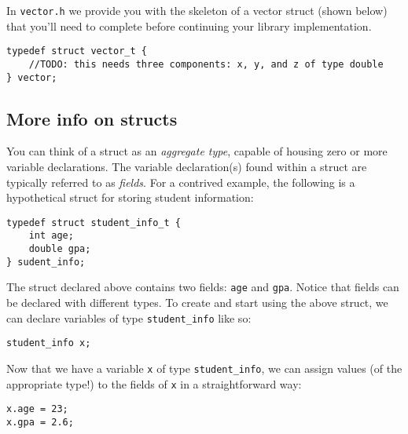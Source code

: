 \documentclass[12pt]{article}
\begin{document}
In \texttt{vector.h} we provide you with the skeleton of a vector struct (shown below) that you'll need to complete before continuing your library implementation.

\begin{mdframed}[backgroundcolor=light-gray, innerleftmargin=10, innertopmargin=1,innerbottommargin=1,linecolor=light-gray]
\begin{lstlisting}
typedef struct vector_t {
    //TODO: this needs three components: x, y, and z of type double
} vector;
\end{lstlisting}
\end{mdframed}

\subsection{More info on structs}

You can think of a struct as an \textit{aggregate type}, capable of housing zero or more variable declarations. The variable declaration(s) found within a struct are typically referred to as \textit{fields}. For a contrived example, the following is a hypothetical struct for storing student information:

\begin{mdframed}[backgroundcolor=light-gray, innerleftmargin=10, innertopmargin=1,innerbottommargin=1,linecolor=light-gray]
\begin{lstlisting}
typedef struct student_info_t {
    int age;
    double gpa;
} sudent_info;
\end{lstlisting}
\end{mdframed} 

The struct declared above contains two fields: \texttt{age} and \texttt{gpa}. Notice that fields can be  declared with different types. To create and start using the above struct, we can declare variables of type \texttt{student\_info} like so:
\begin{mdframed}[backgroundcolor=light-gray, innerleftmargin=10, innertopmargin=1,innerbottommargin=1,linecolor=light-gray]
\begin{lstlisting}
student_info x;
\end{lstlisting}
\end{mdframed} 
Now that we have a variable \texttt{x} of type \texttt{student\_info}, we can assign values (of the appropriate type!) to the fields of \texttt{x} in a straightforward way:

\begin{mdframed}[backgroundcolor=light-gray, innerleftmargin=10, innertopmargin=1,innerbottommargin=1,linecolor=light-gray]
\begin{lstlisting}
x.age = 23;
x.gpa = 2.6;
\end{lstlisting}
\end{mdframed}
\end{document}
